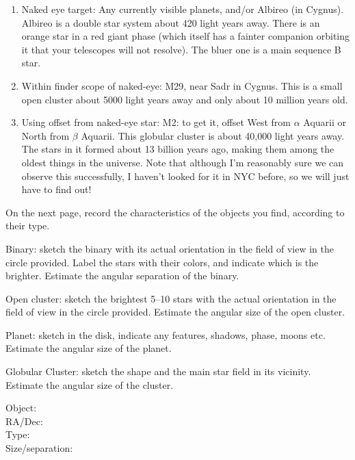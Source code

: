 \begin{enumerate}
\item Naked eye target: Any currently visible planets, and/or Albireo
(in Cygnus). Albireo is a double star system about 420 light years
away. There is an orange star in a red giant phase (which itself has a
fainter companion orbiting it that your telescopes will not
resolve). The bluer one is a main sequence B star. 
\item Within finder scope of naked-eye:
M29, near Sadr in Cygnus. This is a small open cluster about 5000
light years away and only about 10 million years old.
\item Using offset from naked-eye star:
M2: to get it, offset West from $\alpha$ Aquarii or North from $\beta$
Aquarii.
This globular cluster is about 40,000 light years away. The stars in
it formed about 13 billion years ago, making them among the oldest
things in the universe. Note that although I'm reasonably sure we can
observe this successfully, I haven't looked for it in NYC before, so
we will just have to find out!
\end{enumerate}

\medskip\noindent 
On the next page, record the characteristics of the
objects you find, according to their type.

\medskip\noindent 
Binary: sketch the binary with its actual orientation in the field of
view in the circle provided.  Label the stars with their colors, and
indicate which is the brighter. Estimate the angular separation of the binary.

\medskip\noindent 
Open cluster: sketch the brightest 5--10 stars with the actual
orientation in the field of view in the circle provided. Estimate the
angular size of the open cluster.

\medskip\noindent 
Planet:  sketch in the disk, indicate any features, shadows, phase,
moons etc. Estimate the angular size of the planet.

\medskip\noindent
Globular Cluster: sketch the shape and the main star field in its
vicinity. Estimate the angular size of the cluster.


\newpage

\parbox[b]{8cm}{ Object: \makebox[3cm]{\hrulefill}\\
RA/Dec: \makebox[3cm]{\hrulefill} \\
Type: \makebox[3cm]{\hrulefill} \\
Size/separation:  \makebox[1.5cm]{\hrulefill} \\ }   \begin{minipage}[b]{8cm}{}\end{minipage}

